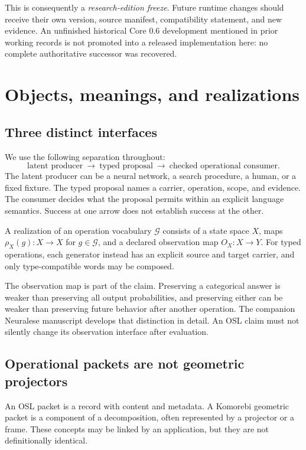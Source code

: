 \documentclass[11pt]{article}
\begin{document}
This is consequently a \emph{research-edition freeze}. Future runtime changes should receive their own version, source manifest, compatibility statement, and new evidence. An unfinished historical Core 0.6 development mentioned in prior working records is not promoted into a released implementation here: no complete authoritative successor was recovered.

\section{Objects, meanings, and realizations}
\subsection{Three distinct interfaces}
We use the following separation throughout:
\[
\text{latent producer}\ \longrightarrow\ \text{typed proposal}\ \longrightarrow\ \text{checked operational consumer}.
\]
The latent producer can be a neural network, a search procedure, a human, or a fixed fixture. The typed proposal names a carrier, operation, scope, and evidence. The consumer decides what the proposal permits within an explicit language semantics. Success at one arrow does not establish success at the other.

\begin{definition}[Realization]
A realization of an operation vocabulary \(\mathcal G\) consists of a state space \(X\), maps \(\rho_X(g):X\to X\) for \(g\in\mathcal G\), and a declared observation map \(O_X:X\to Y\). For typed operations, each generator instead has an explicit source and target carrier, and only type-compatible words may be composed.
\end{definition}
The observation map is part of the claim. Preserving a categorical answer is weaker than preserving all output probabilities, and preserving either can be weaker than preserving future behavior after another operation. The companion Neuralese manuscript develops that distinction in detail. An OSL claim must not silently change its observation interface after evaluation.

\subsection{Operational packets are not geometric projectors}
An OSL packet is a record with content and metadata. A Komorebi geometric packet is a component of a decomposition, often represented by a projector or a frame. These concepts may be linked by an application, but they are not definitionally identical.
\end{document}
